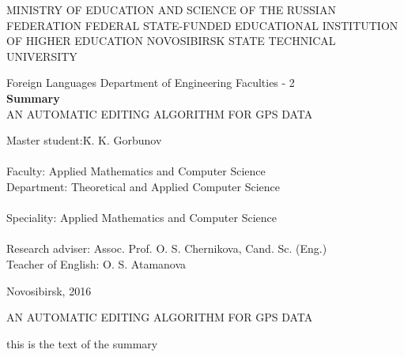 \documentclass[a4paper,12pt]{article}
\begin{document}
\setcounter{secnumdepth}{0}

\begin{titlepage}

	\begin{center}
		\MakeTextUppercase{ministry of education and science of the russian
			federation}
		\bigbreak
		\MakeTextUppercase{federal state-funded educational institution of higher
			education novosibirsk state technical university}
		
		\vspace{150pt}
		
		Foreign Languages Department of Engineering Faculties - 2 \\
		\vspace{100pt}
		\textbf{Summary} \\
		\smallbreak
		\MakeTextUppercase{an automatic editing algorithm for gps data}
		\vspace{100pt}
	\end{center}

	\begin{flushleft}
	\begin{tabbing}
	Master student:\quad\quad \= K. K. Gorbunov \\
	\\
	Faculty:          \> Applied Mathematics and Computer Science \\
	Department:       \> Theoretical and Applied Computer Science \\
	\\
	Speciality:       \> Applied Mathematics and Computer Science \\
	\\
	Research adviser: \> Assoc. Prof. O. S. Chernikova, Cand. Sc. (Eng.)
	\\
	Teacher of English: O. S. Atamanova
	\end{tabbing}
	\end{flushleft}

	\begin{center}
		\vspace{\fill}
		Novosibirsk, 2016
	\end{center}

\end{titlepage}

\newpage

\begin{center}
	\MakeTextUppercase{an automatic editing algorithm for gps data}
\end{center}

this is the text of the summary 

\newpage

\end{document}
